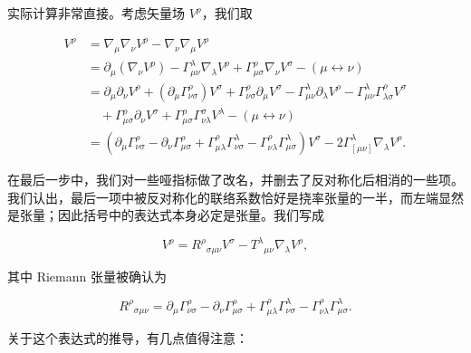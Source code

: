 
实际计算非常直接。考虑矢量场 $V^\rho$，我们取

\begin{align*}
[\nabla_\mu, \nabla_\nu] V^\rho &= \nabla_\mu\nabla_\nu V^\rho - \nabla_\nu\nabla_\mu V^\rho\\
&= \partial_\mu(\nabla_\nu V^\rho) - \Gamma^\lambda_{\mu\nu}\nabla_\lambda V^\rho + \Gamma^\rho_{\mu\sigma}\nabla_\nu V^\sigma - (\mu \leftrightarrow \nu)\\
&= \partial_\mu\partial_\nu V^\rho + (\partial_\mu\Gamma^\rho_{\nu\sigma})V^\sigma + \Gamma^\rho_{\nu\sigma}\partial_\mu V^\sigma - \Gamma^\lambda_{\mu\nu}\partial_\lambda V^\rho - \Gamma^\lambda_{\mu\nu}\Gamma^\rho_{\lambda\sigma}V^\sigma\\
&\quad + \Gamma^\rho_{\mu\sigma}\partial_\nu V^\sigma + \Gamma^\rho_{\mu\sigma}\Gamma^\sigma_{\nu\lambda}V^\lambda - (\mu \leftrightarrow \nu)\\
&= (\partial_\mu\Gamma^\rho_{\nu\sigma} - \partial_\nu\Gamma^\rho_{\mu\sigma} + \Gamma^\rho_{\mu\lambda}\Gamma^\lambda_{\nu\sigma} - \Gamma^\rho_{\nu\lambda}\Gamma^\lambda_{\mu\sigma})V^\sigma - 2\Gamma^\lambda_{[\mu\nu]}\nabla_\lambda V^\rho. \tag{3.111}
\end{align*}

在最后一步中，我们对一些哑指标做了改名，并删去了反对称化后相消的一些项。我们认出，最后一项中被反对称化的联络系数恰好是挠率张量的一半，而左端显然是张量；因此括号中的表达式本身必定是张量。我们写成

\begin{equation*}
[\nabla_\mu, \nabla_\nu] V^\rho = R^\rho{}_{\sigma\mu\nu}V^\sigma - T^\lambda{}_{\mu\nu}\nabla_\lambda V^\rho, \tag{3.112}
\end{equation*}

其中 Riemann 张量被确认为

\begin{equation*}
R^\rho{}_{\sigma\mu\nu} = \partial_\mu\Gamma^\rho_{\nu\sigma} - \partial_\nu\Gamma^\rho_{\mu\sigma} + \Gamma^\rho_{\mu\lambda}\Gamma^\lambda_{\nu\sigma} - \Gamma^\rho_{\nu\lambda}\Gamma^\lambda_{\mu\sigma}. \tag{3.113}
\end{equation*}

关于这个表达式的推导，有几点值得注意：

